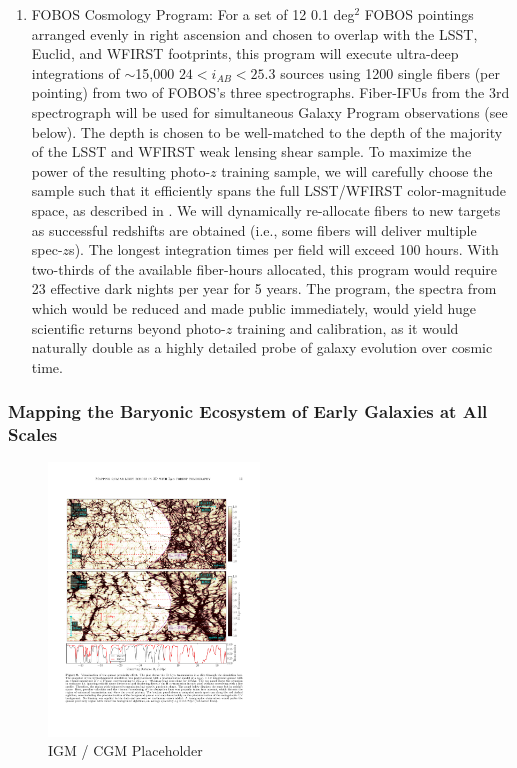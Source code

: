 \documentclass[oneside,11pt]{amsart}
\newcounter{chalno}
\newcommand{\chal}[1]{\refstepcounter{chalno}\label{#1}}
\begin{document}
\chal{photozs}
%
\begin{enumerate}[rightmargin=0.2cm,leftmargin=0.2cm]

\item[] {\textsf {\large FOBOS Cosmology Program:}}  For a set of 12
  0.1 deg$^2$ FOBOS pointings arranged evenly in right ascension and
  chosen to overlap with the LSST, Euclid, and WFIRST footprints, this
  program will execute ultra-deep integrations of $\sim$15,000 $24 <
  i_{AB} < 25.3$ sources using 1200 single fibers (per pointing) from
  two of FOBOS's three spectrographs. 
  Fiber-IFUs from the 3rd
  spectrograph will be used for simultaneous Galaxy Program
  observations (see below).  The depth is chosen to be well-matched to the depth of the majority of the LSST and WFIRST
  weak lensing shear sample. To maximize the power of the resulting
  photo-$z$ training sample, we will carefully choose the sample such that it 
  efficiently spans the full LSST/WFIRST color-magnitude space, as described in \citet{masters15, masters19}. We will
  dynamically re-allocate fibers to new targets as successful
  redshifts are obtained (i.e., some fibers will deliver multiple
  spec-$z$s).  The longest integration times per field will exceed 100
  hours.  With two-thirds of the available fiber-hours allocated, this program would require 23 effective dark nights per year for 5 years.  The program, the spectra from which would be reduced and made public immediately, would yield huge scientific returns beyond photo-$z$ training and calibration, as it would naturally double as 
  a highly detailed probe of galaxy evolution over cosmic time. %

\end{enumerate}


\subsubsection{Mapping the Baryonic Ecosystem of Early Galaxies at All Scales}
\label{sec:galaxies}


\begin{figure}\small
%
\includegraphics[width=0.5\textwidth]{figs/qso_LightEcho_v1.pdf}
%
\caption{IGM / CGM Placeholder  }
%
\label{fig:M31}
%
\end{figure}
\end{document}
